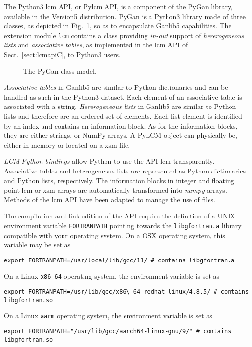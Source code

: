 The Python3 {\sc lcm} API, or Py{\sc lcm} API, is a component of the PyGan library, available in the Version5 distribution.
PyGan is a Python3 library made of three classes, as depicted in Fig.~\ref{fig:PyGan}, so as to encapsulate Ganlib5 capabilities.
The extension module {\tt lcm} contains a class providing {\sl in-out} support of {\sl hererogeneous lists} and
{\sl associative tables}, as implemented in the {\sc lcm} API of Sect.~\ref{sect:lcmapiC}, to Python3 users.

\begin{figure}[htbp]
\begin{center}
\epsfxsize=2.4cm
\centerline{ }
\parbox{12cm}{\caption{The PyGan class model.}\label{fig:PyGan}}
\end{center}  
\end{figure}

\vskip 0.2cm

{\sl Associative tables} in Ganlib5 are similar to Python dictionaries and can be handled
as such in the Python3 dataset.  Each element of an associative table
 is associated with a string.
{\sl Hererogeneous lists} in Ganlib5 are similar to Python lists and therefore are an ordered set
of elements. Each list element is identified by an index and contains
an information block. As for the information blocks, they are either
strings, or NumPy arrays.
A PyLCM object can physically be, either in memory or located on a {\sc xsm} file.

\vskip 0.2cm

{\sl LCM Python bindings} allow Python to use the API
{\sc lcm} transparently. Associative tables and heterogeneous lists are
represented as Python dictionaries and Python lists, respectively. The
information blocks in integer and floating point {\sc lcm} or {\sc xsm} arrays
are automatically transformed into {\sl numpy} arrays.
Methods of the {\sc lcm} API have been adapted to manage the use of files.

\vskip 0.2cm

The compilation and link edition of the API require the definition of a UNIX environment variable {\tt FORTRANPATH} pointing towards the {\tt libgfortran.a} library
compatible with your operating system. On a OSX operating system, this variable may be set as
\begin{verbatim}
export FORTRANPATH=/usr/local/lib/gcc/11/ # contains libgfortran.a
\end{verbatim}
\noindent On a Linux {\tt x86\_64} operating system, the environment variable is set as
\begin{verbatim}
export FORTRANPATH=/usr/lib/gcc/x86\_64-redhat-linux/4.8.5/ # contains libgfortran.so
\end{verbatim}
\noindent On a Linux {\tt aarm} operating system, the environment variable is set as
\begin{verbatim}
export FORTRANPATH="/usr/lib/gcc/aarch64-linux-gnu/9/" # contains libgfortran.so
\end{verbatim}

